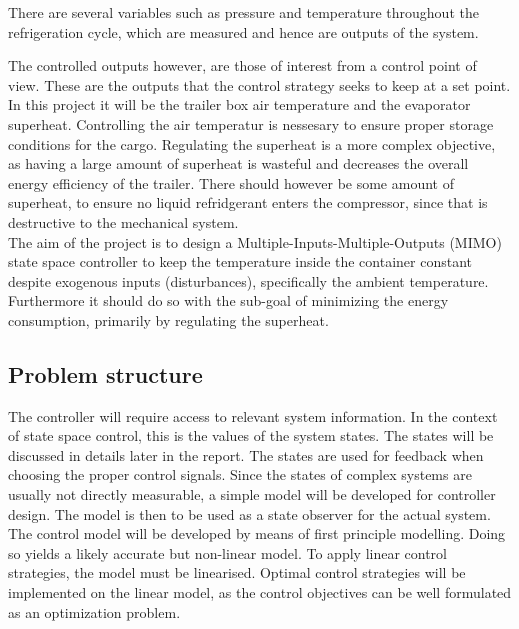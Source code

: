 There are several variables such as pressure and temperature throughout the refrigeration cycle, which are measured and hence are outputs of the system. 

The controlled outputs however, are those of interest from a control point of view. These are the outputs that the control strategy seeks to keep at a set point. In this project it will be the trailer box air temperature and the evaporator superheat. Controlling the air temperatur is nessesary to ensure proper storage conditions for the cargo. Regulating the superheat is a more complex objective, as having a large amount of superheat is wasteful and decreases the overall energy efficiency of the trailer. There should however be some amount of superheat, to ensure no liquid refridgerant enters the compressor, since that is destructive to the mechanical system.\\

The aim of the project is to design a Multiple-Inputs-Multiple-Outputs (MIMO) state space controller to keep the temperature inside the container constant despite exogenous inputs (disturbances), specifically the ambient temperature. Furthermore it should do so with the sub-goal of minimizing the energy consumption, primarily by regulating the superheat.

\subsection{Problem structure}

The controller will require access to relevant system information. In the context of state space control, this is the values of the system states. The states will be discussed in details later in the report. The states are used for feedback when choosing the proper control signals. Since the states of complex systems are usually not directly measurable, a simple model will be developed for controller design. The model is then to be used as a state observer for the actual system. \\

The control model will be developed by means of first principle modelling. Doing so yields a likely accurate but non-linear model. To apply linear control strategies, the model must be linearised. Optimal control strategies will be implemented on the linear model, as the control objectives can be well formulated as an optimization problem.\\


		
